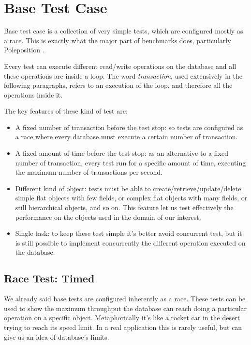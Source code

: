 	\section{Base Test Case}
Base test case is a collection of very simple tests, which are configured mostly as a race. This is exactly what the major part of benchmarks does, particularly Poleposition \cite{poleposition}.

Every test can execute different read/write operations on the database and all these operations are inside a loop. The word \emph{transaction}, used extensively in the following paragraphs, refers to an execution of the loop, and therefore all the operations inside it.

The key features of these kind of test are:
\begin{itemize}
	\item A fixed number of transaction before the test stop: so tests are configured as a race where every database must execute a certain number of transaction.
	\item A fixed amount of time before the test stop: as an alternative to a fixed number of transaction, every test run for a specific amount of time, executing the maximum number of transactions per second. 
	\item Different kind of object: tests must be able to create/retrieve/update/delete simple flat objects with few fields, or complex flat objects with many fields, or still hierarchical objects, and so on. This feature let us test effectively the performance on the objects used in the domain of our interest.
	\item Single task: to keep these test simple it's better avoid concurrent test, but it is still possible to implement concurrently the different operation executed on the database.
\end{itemize}
	
		\subsection{Race Test: Timed}
We already said base tests are configured inherently as a race. These tests can be used to show the maximum throughput the database can reach doing a particular operation on a specific object. Metaphorically it's like a rocket car in the desert trying to reach its speed limit. In a real application this is rarely useful, but can give us an idea of database's limits. 

